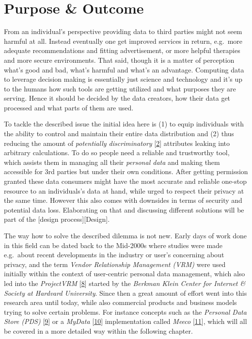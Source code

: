 \documentclass[12pt,english,a4paper,titlepage,cleardoublepage=empty,dottedtoc]{report}
\begin{document}
\section{Purpose \& Outcome}\label{purpose-outcome}

From an individual's perspective providing data to third parties might
not seem harmful at all. Instead eventually one get improved services in
return, e.g.~more adequate recommendations and fitting advertisement, or
more helpful therapies and more secure environments. That said, though
it is a matter of perception what's good and bad, what's harmful and
what's an advantage. Computing data to leverage decision making is
essentially just science and technology and it's up to the humans how
such tools are getting utilized and what purposes they are serving.
Hence it should be decided by the data creators, how their data get
processed and what parts of them are used.

To tackle the described issue the initial idea here is (1) to equip
individuals with the ability to control and maintain their entire data
distribution and (2) thus reducing the amount of \emph{potentially
discriminatory}
{[}\protect\hyperlink{ref-paper_2008_discrimination-aware-data-mining}{2}{]}
attributes leaking into arbitrary calculations. To do so people need a
reliable and trustworthy tool, which assists them in managing all their
\emph{personal data} and making them accessible for 3rd parties but
under their own conditions. After getting permission granted these data
consumers might have the most accurate and reliable one-stop resource to
an individuals's data at hand, while urged to respect their privacy at
the same time. However this also comes with downsides in terms of
security and potential data loss. Elaborating on that and discussing
different solutions will be part of the {[}design
process{]}{[}Design{]}.

The way how to solve the described dilemma is not new. Early days of
work done in this field can be dated back to the Mid-2000s where studies
were made e.g.~about recent developments in the industry or user's
concerning about privacy, and the term \emph{Vendor Relationship
Management (VRM)} were used initially within the context of user-centric
personal data management, which also led into the \emph{ProjectVRM}
{[}\protect\hyperlink{ref-web_2010_projectvrm_about}{8}{]} started by
the \emph{Berkman Klein Center for Internet \& Society at Hardvard
University}. Since then a great amount of effort went into this research
area until today, while also commercial products and business models
trying to solve certain problems. For instance concepts such as the
\emph{Personal Data Store (PDS)}
{[}\protect\hyperlink{ref-paper_2013_the-personal-data-store-approach-to-personal-data-security_2013}{9}{]}
or a \emph{MyData}
{[}\protect\hyperlink{ref-whitepaper_2014_mydata-a-nordic-model-for-human-centered-personal-data-management-and-processing}{10}{]}
implementation called \emph{Meeco}
{[}\protect\hyperlink{ref-web_2016_meeco-how-it-works}{11}{]}, which
will all be covered in a more detailed way within the following chapter.
\end{document}
